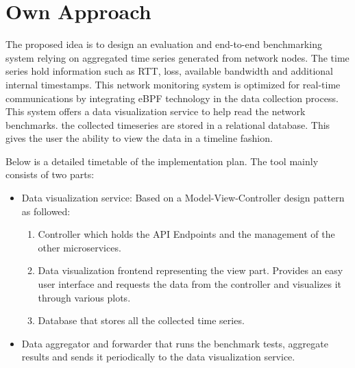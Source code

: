 \cleardoublepage
\chapter{Own Approach}\label{sec:contrib1}\minitoc\vspace{.5cm}

The proposed idea is to design an evaluation and end-to-end benchmarking system relying on aggregated time series generated from network nodes.
The time series hold information such as RTT, loss, available bandwidth and additional internal timestamps.
This network monitoring system is optimized for real-time communications by integrating eBPF technology in the data collection process.
This system offers a data visualization service to help read the network benchmarks.
the collected timeseries are stored in a relational database. This gives the user the ability to view the data in a timeline fashion.

Below is a detailed timetable of the implementation plan.
The tool mainly consists of two parts:
\begin{itemize}
    \item Data visualization service: Based on a Model-View-Controller design pattern as followed:
\begin{enumerate}
    \item Controller which holds the API Endpoints and the management of the other microservices.
    \item Data visualization frontend representing the view part. Provides an easy user interface and requests the data from the controller and visualizes it through various plots.
    \item Database that stores all the collected time series.
\end{enumerate}
    \item Data aggregator and forwarder that runs the benchmark tests, aggregate results and sends it periodically to the data visualization service.
\end{itemize}\\

